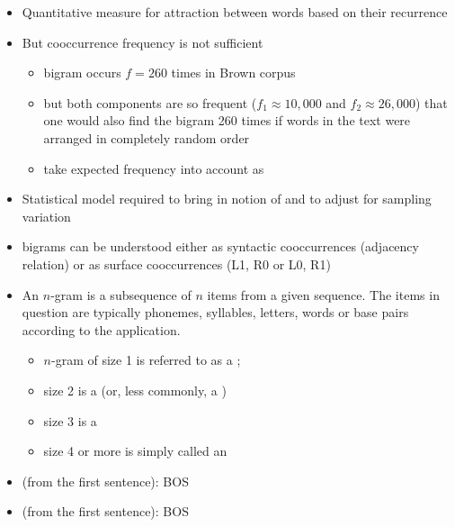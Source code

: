 \documentclass[a4paper,landscape,headrule,footrule,xetex]{foils}
\begin{document}
\begin{itemize}
\item Quantitative measure for attraction between words based
on their recurrence \into {}
\item 
But cooccurrence frequency is not sufficient
\begin{itemize}
\item bigram  occurs $f = 260$ times in Brown corpus
\item but both components are so frequent ($f_1 \approx   10,000$ and
$f_2 \approx   26,000$) that one would also find the bigram 260 times if
words in the text were arranged in completely random order

\item take expected frequency into account as 
\end{itemize}
\item 
Statistical model required to bring in notion of  and to adjust for sampling variation
\item  bigrams can be understood either as syntactic
cooccurrences (adjacency relation) or as surface
cooccurrences (L1, R0 or L0, R1)
\end{itemize}

\begin{itemize}
\item An $n$-gram is a subsequence of $n$ items from a given
  sequence. The items in question are typically phonemes, syllables, letters,
  words or base pairs according to the application.
  \begin{itemize}
  \item $n$-gram of size 1 is referred to as a ;
  \item size 2 is a  (or, less commonly, a )
  \item size 3 is a 
  \item size 4 or more is simply called an 
\end{itemize}
\item {} (from the first sentence):
BOS 
\item {} (from the first sentence):
BOS 
\end{itemize}
\end{document}
